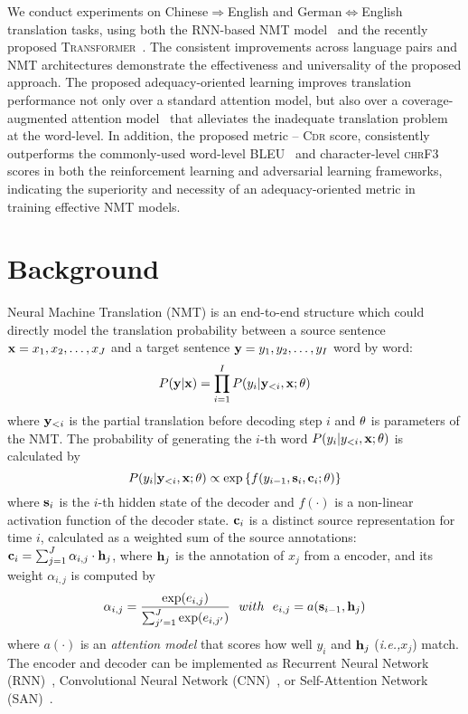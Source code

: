 \documentclass[letterpaper]{article} \usepackage{aaai19}  \usepackage{times}  \usepackage{helvet}  \usepackage{courier}  \usepackage{url}  \usepackage{graphicx}  \frenchspacing  \setlength{\pdfpagewidth}{8.5in}  \setlength{\pdfpageheight}{11in}  \usepackage{amsmath}
\begin{document}
We conduct experiments on Chinese$\Rightarrow$English and German$\Leftrightarrow$English translation tasks, using both the RNN-based NMT model~\cite{bahdanau2014neural} and the recently proposed \textsc{Transformer}~\cite{vaswani2017attention}. The consistent improvements across language pairs and NMT architectures demonstrate the effectiveness and universality of the proposed approach. 
The proposed adequacy-oriented learning improves translation performance not only over a standard attention model, but also over a coverage-augmented attention model~\cite{tu2016modeling} that alleviates the inadequate translation problem at the word-level. In addition, the proposed metric -- \textsc{Cdr} score, consistently outperforms the commonly-used word-level BLEU~\cite{papineni2002bleu} and character-level \textsc{chrF3}~\cite{popovic2015chrf} scores in both the reinforcement learning and adversarial learning frameworks, indicating the superiority and necessity of an adequacy-oriented metric in training effective NMT models.

\section{Background}

Neural Machine Translation (NMT) is an end-to-end structure which could directly model the translation probability between a source sentence ${\bf x}=x_{1}, x_{2}, \dots, x_{J}$ and a target sentence ${\bf y}=y_{1}, y_{2}, \dots, y_{I}$ word by word:
\begin{equation}
    P({\bf y}|{\bf x})=\prod_{i=1}^{I}P(y_{i}|{\bf y}_{< i}, {\bf x}; {\bf \theta})
\end{equation}
where ${\bf y}_{<i}$ is the partial translation before decoding step $i$ and ${\bf \theta}$ is parameters of the NMT. The probability of generating the $i$-th word $P(y_{i}|y_{< i}, {\bf x};\theta)$ is calculated by
\begin{equation}
    P(y_{i}|{\bf y}_{< i},{\bf x};\theta)\propto \exp\left \{ f(y_{i-1}, {\bf s}_{i}, {\bf c}_{i}; {\bf \theta})\right \}
\end{equation}
where ${\bf s}_i$ is the $i$-th hidden state of the decoder and $f(\cdot)$ is a non-linear activation function of the decoder state. ${\bf c}_i$ is a distinct source representation for time $i$, calculated as a weighted sum of the source annotations: ${\bf c}_i = \sum_{j=1}^{J}{\alpha_{i,j}\cdot {\bf h}_j}$,
where ${\bf h}_j$ is the annotation of $x_j$ from a encoder, and its weight $\alpha_{i,j}$ is computed by
\begin{equation}
\alpha_{i,j} = \frac{\exp(e_{i,j})}{\sum_{j'=1}^{J} \exp(e_{i,j'})} \ \ with \ \  e_{i,j} = a({\bf s}_{i-1}, {\bf h}_j)
\label{eqn-alignment-probability} 
\end{equation}
where $a(\cdot)$ is an \emph{attention model} that scores how well $y_i$ and ${\bf h}_j$ (\emph{i.e.,}\xspace $x_j$) match. The encoder and decoder can be implemented as Recurrent Neural Network (RNN)~\cite{bahdanau2014neural}, Convolutional Neural Network (CNN)~\cite{gehring2017convolutional}, or Self-Attention Network (SAN)~\cite{vaswani2017attention}.
\end{document}
